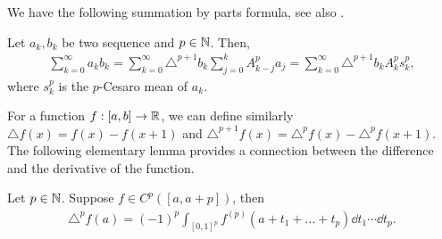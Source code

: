 We have the following summation by parts formula, see also \citet[(A.4.8)]{dai2013_ApproximationTheory}.

\begin{proposition}
  \label{prop:Aux_SumByParts}
  Let $a_k,b_k$ be two sequence and $p \in \mathbb{N}$. Then,
  \begin{align*}
    \sum_{k=0}^{\infty} a_k b_k = \sum_{k=0}^{\infty} \triangle^{p+1} b_k \sum_{j=0}^k A^p_{k-j}a_j
    =  \sum_{k=0}^{\infty} \triangle^{p+1} b_k A_k^p s_k^p,
  \end{align*}
  where $s_k^p$ is the $p$-Cesaro mean of $a_k$.
\end{proposition}

For a function $f : [a,b] \to \mathbb{R}$, we can define similarly $\triangle f(x) = f(x) - f(x+1)$ and $\triangle^{p+1} f(x) = \triangle^p f(x)-\triangle^p f(x+1)$.
The following elementary lemma provides a connection between the difference and the derivative of the function.
\begin{lemma}
  Let $p \in \mathbb{N}$.
  Suppose $f \in C^p([a,a+p])$, then
  \begin{align}
    \label{eq:A_Difference_Derivative}
    \triangle^p f(a) = (-1)^{p} \int_{[0,1]^p} f^{(p)}(a+t_1+\dots+t_p) \dd t_1\cdots \dd t_p.
  \end{align}
\end{lemma}

